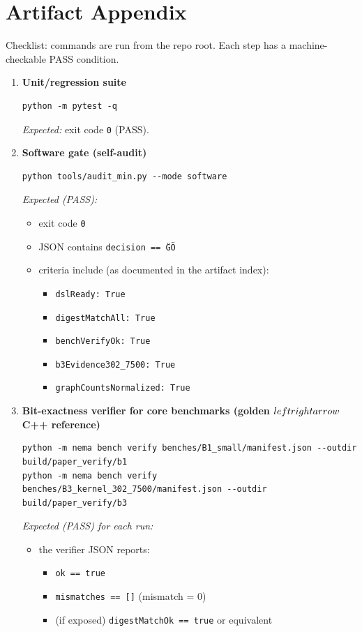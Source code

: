 \appendix
\section{Artifact Appendix}

Checklist: commands are run from the repo root. Each step has a machine-checkable PASS condition.

\begin{enumerate}
\item \textbf{Unit/regression suite}
\begin{verbatim}
python -m pytest -q
\end{verbatim}
\textit{Expected:} exit code \texttt{0} (PASS).

\item \textbf{Software gate (self-audit)}
\begin{verbatim}
python tools/audit_min.py --mode software
\end{verbatim}
\textit{Expected (PASS):}
\begin{itemize}
\item exit code \texttt{0}
\item JSON contains \texttt{decision == \"GO\"}
\item criteria include (as documented in the artifact index):
\begin{itemize}
\item \texttt{dslReady: True}
\item \texttt{digestMatchAll: True}
\item \texttt{benchVerifyOk: True}
\item \texttt{b3Evidence302\_7500: True}
\item \texttt{graphCountsNormalized: True}
\end{itemize}
\end{itemize}

\item \textbf{Bit-exactness verifier for core benchmarks (golden \texorpdfstring{$\\leftrightarrow$}{<->} C++ reference)}
\begin{verbatim}
python -m nema bench verify benches/B1_small/manifest.json --outdir build/paper_verify/b1
python -m nema bench verify benches/B3_kernel_302_7500/manifest.json --outdir build/paper_verify/b3
\end{verbatim}
\textit{Expected (PASS) for each run:}
\begin{itemize}
\item the verifier JSON reports:
\begin{itemize}
\item \texttt{ok == true}
\item \texttt{mismatches == []} (mismatch = 0)
\item (if exposed) \texttt{digestMatchOk == true} or equivalent
\end{itemize}
\end{itemize}


\end{enumerate}
